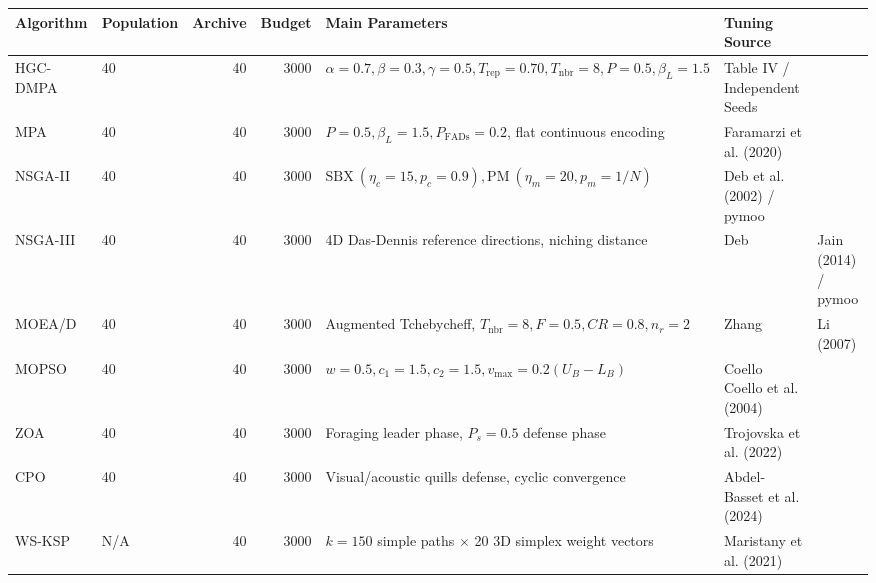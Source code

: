 \begin{tabular}{llrrll}
\toprule
Algorithm & Population & Archive & Budget & Main Parameters & Tuning Source \\
\midrule
HGC-DMPA & 40 & 40 & 3000 & $\alpha=0.7, \beta=0.3, \gamma=0.5, T_{\mathrm{rep}}=0.70, T_{\mathrm{nbr}}=8, P=0.5, \beta_L=1.5$ & Table IV / Independent Seeds \\
MPA & 40 & 40 & 3000 & $P=0.5, \beta_L=1.5, P_{\mathrm{FADs}}=0.2$, flat continuous encoding & Faramarzi et al. (2020) \\
NSGA-II & 40 & 40 & 3000 & $\mathrm{SBX}\ (\eta_c=15, p_c=0.9), \mathrm{PM}\ (\eta_m=20, p_m=1/N)$ & Deb et al. (2002) / pymoo \\
NSGA-III & 40 & 40 & 3000 & 4D Das-Dennis reference directions, niching distance & Deb & Jain (2014) / pymoo \\
MOEA/D & 40 & 40 & 3000 & Augmented Tchebycheff, $T_{\mathrm{nbr}}=8, F=0.5, CR=0.8, n_r=2$ & Zhang & Li (2007) \\
MOPSO & 40 & 40 & 3000 & $w=0.5, c_1=1.5, c_2=1.5, v_{\max}=0.2(U_B-L_B)$ & Coello Coello et al. (2004) \\
ZOA & 40 & 40 & 3000 & Foraging leader phase, $P_s=0.5$ defense phase & Trojovska et al. (2022) \\
CPO & 40 & 40 & 3000 & Visual/acoustic quills defense, cyclic convergence & Abdel-Basset et al. (2024) \\
WS-KSP & N/A & 40 & 3000 & $k=150$ simple paths $\times$ 20 3D simplex weight vectors & Maristany et al. (2021) \\
\bottomrule
\end{tabular}
